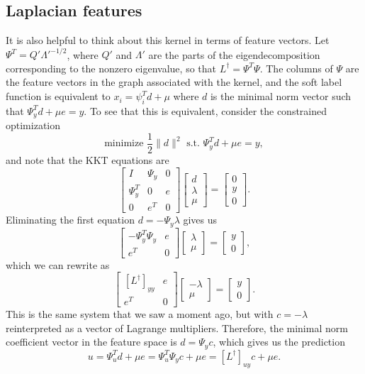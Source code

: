 \documentclass[12pt, leqno]{article} %
\begin{document}
\subsection{Laplacian features}

It is also helpful to think about this kernel in terms of feature
vectors.  Let $\Psi^T = Q' \Lambda'^{-1/2}$, where $Q'$ and $\Lambda'$
are the parts of the eigendecomposition corresponding to the nonzero
eigenvalue, so that $L^\dagger = \Psi^T \Psi$.  The columns of $\Psi$
are the feature vectors in the graph associated with the kernel, and
the soft label function is equivalent to $x_i = \psi_i^T d + \mu$
where $d$ is the minimal norm vector such that $\Psi_y^T d + \mu e = y$.
To see that this is equivalent, consider the constrained optimization
\[
  \mbox{minimize } \frac{1}{2} \|d\|^2
  \mbox{ s.t.~} \Psi_y^T d + \mu e = y,
\]
and note that the KKT equations are
\[
  \begin{bmatrix}
    I & \Psi_y & 0 \\
    \Psi_y^T & 0 & e \\
    0 & e^T & 0
  \end{bmatrix}
  \begin{bmatrix} d \\ \lambda \\ \mu \end{bmatrix} =
  \begin{bmatrix} 0 \\ y \\ 0 \end{bmatrix}.
\]
Eliminating the first equation $d = -\Psi_y \lambda$ gives us
\[
  \begin{bmatrix}
    -\Psi_y^T \Psi_y & e \\
    e^T & 0
  \end{bmatrix}
  \begin{bmatrix} \lambda \\ \mu \end{bmatrix} =
  \begin{bmatrix} y \\ 0 \end{bmatrix},
\]
which we can rewrite as
\[
  \begin{bmatrix}
    [L^\dagger]_{yy} & e \\
    e^T & 0
  \end{bmatrix}
  \begin{bmatrix} -\lambda \\ \mu \end{bmatrix} =
  \begin{bmatrix} y \\ 0 \end{bmatrix}.
\]
This is the same system that we saw a moment ago, but with
$c = -\lambda$ reinterpreted as a vector of Lagrange multipliers.
Therefore, the minimal norm coefficient vector in the feature space
is $d = \Psi_y c$, which gives us the prediction
\[
  u = \Psi_u^T d + \mu e = \Psi_u^T \Psi_y c + \mu e =
  [L^\dagger]_{uy} c + \mu e.
\]
\end{document}
